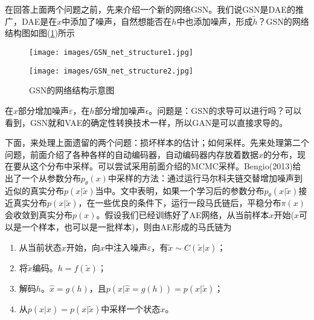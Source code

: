        在回答上面两个问题之前，先来介绍一个新的网络GSN。我们说GSN是DAE的推广，DAE是在$x$中添加了噪声，自然想能否在$h$中也添加噪声，形成$\tilde{h}$？GSN的网络结构图如图(\ref{fig:GSN的网络结构示意图})所示
                \begin{figure}[H]
                  \centering
                  \begin{varwidth}[t]{\textwidth}
                    \vspace{0pt}
                \texttt{[image: images/GSN\_net\_structure1.jpg]}
                  \end{varwidth}
                  \qquad
                  \begin{varwidth}[t]{\textwidth}
                    \vspace{0pt}
                    \texttt{[image: images/GSN\_net\_structure2.jpg]}
                  \end{varwidth}
            \caption{GSN的网络结构示意图}
            \label{fig:GSN的网络结构示意图}
                \end{figure}
        在$x$部分增加噪声$\varepsilon$，在$h$部分增加噪声$\epsilon$。问题是：GSN的求导可以进行吗？可以看到，GSN就和VAE的确定性转换技术一样，所以GAN是可以直接求导的。
        \par
        下面，来处理上面遗留的两个问题：损坏样本的估计；如何采样。先来处理第二个问题，前面介绍了各种各样的自动编码器，自动编码器内存放着数据$x$的分布，现在要从这个分布中采样。可以尝试采用前面介绍的MCMC采样。Bengio(2013)给出了一个从参数分布$p_\theta(x)$中采样的方法：通过运行马尔科夫链交替增加噪声到近似的真实分布$p(x|\tilde{x})$当中。文中表明，如果一个学习后的参数分布$p_\theta(x|\tilde{x})$接近真实分布$p(x|\tilde{x})$，在一些优良的条件下，运行一段马氏链后，平稳分布$\pi(x)$会收敛到真实分布$p(x)$。假设我们已经训练好了AE网络，从当前样本$x$开始($x$可以是一个样本，也可以是一批样本)，则由AE形成的马氏链为
        \begin{enumerate}
        \item 从当前状态$x$开始，向$x$中注入噪声$\varepsilon$，有$\tilde{x}\sim C(\tilde{x}|x)$；
        \item 将$\tilde{x}$编码。$h = f(\tilde{x})$；
        \item 解码$h$。$\hat{x} = g(h)$，且$p(x|\hat{x} =g(h)) = p(x|\tilde{x})$；
        \item 从$p(x|\hat{x}) = p(x|\tilde{x})$中采样一个状态$x$。
        \end{enumerate}
